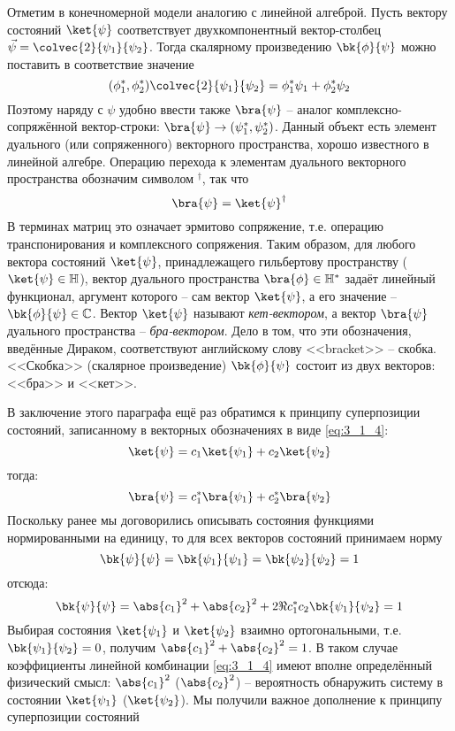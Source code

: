 Отметим в конечномерной модели аналогию с линейной алгеброй. Пусть вектору состояний $\ket{\psi}$ соответствует двухкомпонентный вектор-столбец $\vec{\psi} = \colvec{2}{\psi_1}{\psi_2}$. Тогда скалярному произведению $\bk{\phi}{\psi}$ можно поставить в соответствие значение%
%
$$
(\phi_1^*, \phi_2^*) \colvec{2}{\psi_1}{\psi_2} = \phi_1^*\psi_1 + \phi_2^* \psi_2
$$%
%
Поэтому наряду с $\psi$ удобно ввести также $\bra{\psi}$ -- аналог комплексно-сопряжённой вектор-строки: $\bra{\psi} \to (\psi_1^*, \psi_2^*)$. Данный объект есть элемент дуального (или сопряженного) векторного пространства, хорошо известного в линейной алгебре. Операцию перехода к элементам дуального векторного пространства обозначим символом $^\dag$, так что%
%
$$
\bra{\psi} = \ket{\psi}^\dag
$$%
%
В терминах матриц это означает эрмитово\footnotemark{} сопряжение, т.е. операцию транспонирования и комплексного сопряжения. Таким образом, для любого вектора состояний $\ket{\psi}$, принадлежащего гильбертову пространству ($\ket{\psi} \in \mathbb{H}$), вектор дуального пространства $\bra{\phi} \in \mathbb{H}^*$ задаёт линейный функционал, аргумент которого -- сам вектор $\ket{\psi}$, а его значение -- $\bk{\phi}{\psi} \in \mathbb{C}$.
%
Вектор $\ket{\psi}$ называют {\em кет-вектором}, а вектор $\bra{\psi}$ дуального пространства -- {\em бра-вектором}. Дело в том, что эти обозначения, введённые Дираком, соответствуют английскому слову <<bracket>> -- скобка. <<Скобка>> (скалярное произведение) $\bk{\phi}{\psi}$ состоит из двух векторов: <<бра>> и <<кет>>.

В заключение этого параграфа ещё раз обратимся к принципу суперпозиции состояний, записанному в векторных обозначениях в виде \eqref{eq:3_1_4}:%
%
$$
\ket{\psi} = c_1 \ket{\psi_1} + c_2 \ket{\psi_2}
$$%
%
тогда:%
%
$$
\bra{\psi} = c_1^* \bra{\psi_1} + c_2^* \bra{\psi_2}
$$%
%
Поскольку ранее мы договорились описывать состояния функциями нормированными на единицу, то для всех векторов состояний принимаем норму%
%
$$
\bk{\psi}{\psi} = \bk{\psi_1}{\psi_1} = \bk{\psi_2}{\psi_2} = 1
$$%
%
отсюда:%
%
$$
\bk{\psi}{\psi} = \abs{c_1}^2 + \abs{c_2}^2 + 2 \Re{c_1^* c_2 \bk{\psi_1}{\psi_2}} = 1
$$%
%
Выбирая состояния $\ket{\psi_1}$ и $\ket{\psi_2}$ взаимно ортогональными, т.е. $\bk{\psi_1}{\psi_2} = 0$, получим $\abs{c_1}^2 + \abs{c_2}^2 = 1$. В таком случае коэффициенты линейной комбинации \eqref{eq:3_1_4} имеют вполне определённый физический смысл: $\abs{c_1}^2$ ($\abs{c_2}^2$) -- вероятность обнаружить систему в состоянии $\ket{\psi_1}$ ($\ket{\psi_2}$). Мы получили важное дополнение к принципу суперпозиции состояний

